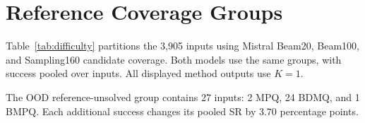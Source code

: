 \section{Reference Coverage Groups}
\label{app:reference_difficulty}
Table~\ref{tab:difficulty} partitions the 3,905 inputs using Mistral Beam20, Beam100, and Sampling160 candidate coverage. Both models use the same groups, with success pooled over inputs. All displayed method outputs use $K=1$.

The OOD reference-unsolved group contains 27 inputs: 2 MPQ, 24 BDMQ, and 1 BMPQ. Each additional success changes its pooled SR by 3.70 percentage points.

\clearpage
